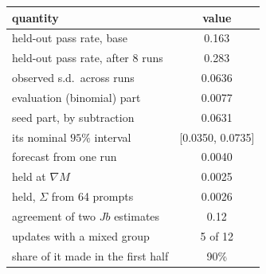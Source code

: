\setlength{\tabcolsep}{4pt}
\begin{tabular}{@{}lc@{}}
\toprule
quantity & value \\
\midrule
held-out pass rate, base & 0.163 \\
held-out pass rate, after 8 runs & 0.283 \\
\midrule
observed s.d.\ across runs & 0.0636 \\
\quad evaluation (binomial) part & 0.0077 \\
\quad seed part, by subtraction & 0.0631 \\
\quad its nominal $95\%$ interval & [0.0350, 0.0735] \\
\midrule
forecast from one run & 0.0040 \\
\quad held at $\nabla M$ & 0.0025 \\
\quad held, $\Sigma$ from 64 prompts & 0.0026 \\
\midrule
agreement of two $Jb$ estimates & 0.12 \\
updates with a mixed group & 5 of 12 \\
share of it made in the first half & 90\% \\
\bottomrule
\end{tabular}